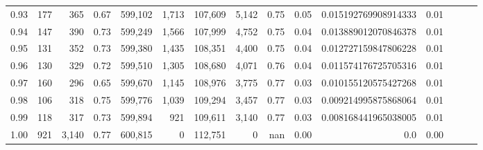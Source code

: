 \begin{tabular}{rrrrrrrrrrrrrrr}
0.93 &     177 &    365 &  0.67 &  599,102 &    1,713 &  107,609 &    5,142 &  0.75 &  0.05 &  0.015192769908914333 &      0.01 \\
0.94 &     147 &    390 &  0.73 &  599,249 &    1,566 &  107,999 &    4,752 &  0.75 &  0.04 &  0.013889012070846378 &      0.01 \\
0.95 &     131 &    352 &  0.73 &  599,380 &    1,435 &  108,351 &    4,400 &  0.75 &  0.04 &  0.012727159847806228 &      0.01 \\
0.96 &     130 &    329 &  0.72 &  599,510 &    1,305 &  108,680 &    4,071 &  0.76 &  0.04 &  0.011574176725705316 &      0.01 \\
0.97 &     160 &    296 &  0.65 &  599,670 &    1,145 &  108,976 &    3,775 &  0.77 &  0.03 &  0.010155120575427268 &      0.01 \\
0.98 &     106 &    318 &  0.75 &  599,776 &    1,039 &  109,294 &    3,457 &  0.77 &  0.03 &  0.009214995875868064 &      0.01 \\
0.99 &     118 &    317 &  0.73 &  599,894 &      921 &  109,611 &    3,140 &  0.77 &  0.03 &  0.008168441965038005 &      0.01 \\
1.00 &     921 &  3,140 &  0.77 &  600,815 &        0 &  112,751 &        0 &   nan &  0.00 &                   0.0 &      0.00 \\
\bottomrule
\end{tabular}
